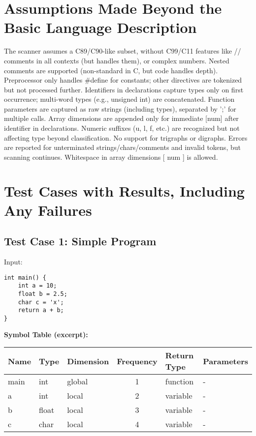 \documentclass{article}
\begin{document}
\section{Assumptions Made Beyond the Basic Language Description} The scanner assumes a C89/C90-like subset, without C99/C11 features like // comments in all contexts (but handles them), or complex numbers. Nested comments are supported (non-standard in C, but code handles depth). Preprocessor only handles \#define for constants; other directives are tokenized but not processed further. Identifiers in declarations capture types only on first occurrence; multi-word types (e.g., unsigned int) are concatenated. Function parameters are captured as raw strings (including types), separated by ';' for multiple calls. Array dimensions are appended only for immediate [num] after identifier in declarations. Numeric suffixes (u, l, f, etc.) are recognized but not affecting type beyond classification. No support for trigraphs or digraphs. Errors are reported for unterminated strings/chars/comments and invalid tokens, but scanning continues. Whitespace in array dimensions [ num ] is allowed.

\section{Test Cases with Results, Including Any Failures}

\subsection{Test Case 1: Simple Program}
Input:
\begin{verbatim}
int main() {
    int a = 10;
    float b = 2.5;
    char c = 'x';
    return a + b;
}
\end{verbatim}

\bigskip
\textbf{Symbol Table (excerpt):}
\begin{center}
\begin{tabular}{|l|l|l|c|l|l|}
\hline
Name & Type & Dimension & Frequency & Return Type & Parameters \\
\hline
main & int   & global & 1 & function & - \\
a    & int   & local  & 2 & variable & - \\
b    & float & local  & 3 & variable & - \\
c    & char  & local  & 4 & variable & - \\
\hline
\end{tabular}
\end{center}
\end{document}
